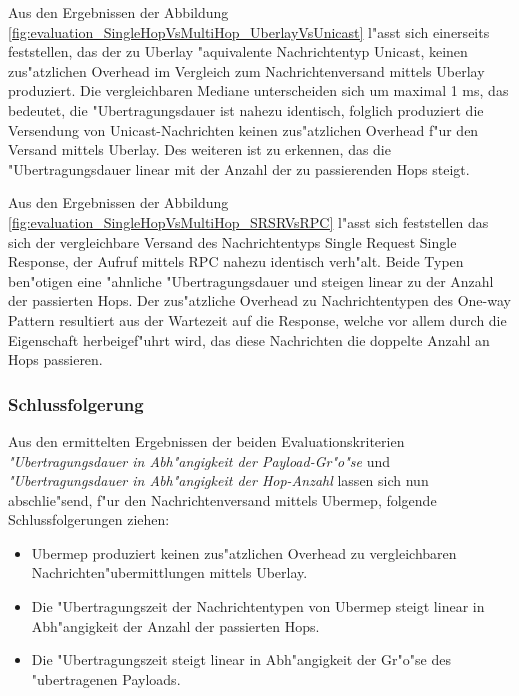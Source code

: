 Aus den Ergebnissen der Abbildung \ref{fig:evaluation_SingleHopVsMultiHop_UberlayVsUnicast} l"asst sich einerseits feststellen, das der zu Uberlay "aquivalente Nachrichtentyp Unicast, keinen zus"atzlichen Overhead im Vergleich zum Nachrichtenversand mittels Uberlay produziert. Die vergleichbaren Mediane unterscheiden sich um maximal 1 ms, das bedeutet, die "Ubertragungsdauer ist nahezu identisch, folglich produziert die Versendung von Unicast-Nachrichten keinen zus"atzlichen Overhead f"ur den Versand mittels Uberlay. Des weiteren ist zu erkennen, das die "Ubertragungsdauer linear mit der Anzahl der zu passierenden Hops steigt.

Aus den Ergebnissen der Abbildung \ref{fig:evaluation_SingleHopVsMultiHop_SRSRVsRPC} l"asst sich feststellen das sich der vergleichbare Versand des Nachrichtentyps Single Request Single Response, der Aufruf mittels RPC nahezu identisch verh"alt. Beide Typen ben"otigen eine "ahnliche "Ubertragungsdauer und steigen linear zu der Anzahl der passierten Hops. Der zus"atzliche Overhead zu Nachrichtentypen des One-way Pattern resultiert aus der Wartezeit auf die Response, welche vor allem durch die Eigenschaft herbeigef"uhrt wird, das diese Nachrichten die doppelte Anzahl an Hops passieren.

\subsubsection{Schlussfolgerung}

Aus den ermittelten Ergebnissen der beiden Evaluationskriterien \emph{"Ubertragungsdauer in Abh"angigkeit der Payload-Gr"o"se} und \emph{"Ubertragungsdauer in Abh"angigkeit der Hop-Anzahl} lassen sich nun abschlie"send, f"ur den Nachrichtenversand mittels Ubermep, folgende Schlussfolgerungen ziehen:

\begin{itemize}
\item Ubermep produziert keinen zus"atzlichen Overhead zu vergleichbaren Nachrichten"ubermittlungen mittels Uberlay.
\item Die "Ubertragungszeit der Nachrichtentypen von Ubermep steigt linear in Abh"angigkeit der Anzahl der passierten Hops.
\item Die "Ubertragungszeit steigt linear in Abh"angigkeit der Gr"o"se des "ubertragenen Payloads.
\end{itemize}

